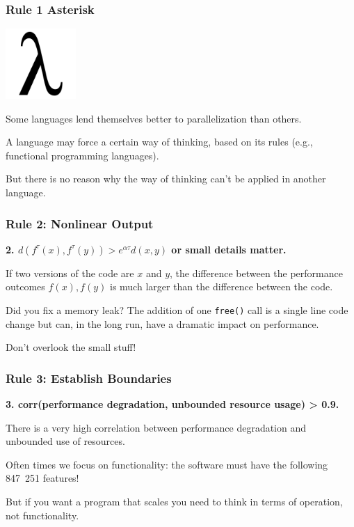 \begin{frame}
\frametitle{Rule 1 Asterisk}

\begin{center}
	\includegraphics[width=0.2\textwidth]{images/lambda.png}
\end{center}

Some languages lend themselves better to parallelization than others. 

A language may force a certain way of thinking, based on its rules (e.g., functional programming languages). 

But there is no reason why the way of thinking can't be applied in another language.


\end{frame}



\begin{frame}
\frametitle{Rule 2: Nonlinear Output}

\textbf{2. $d(f^{\tau}(x), f^{\tau}(y)) > e^{\alpha\tau} d(x, y)$ or small details matter.}

If two versions of the code are $x$ and $y$, the difference between the performance outcomes $f(x), f(y)$ is much larger than the difference between the code.

Did you fix a memory leak? The addition of one \texttt{free()} call is a single line code change but can, in the long run, have a dramatic impact on performance. 

Don't overlook the small stuff!

\end{frame}




\begin{frame}
\frametitle{Rule 3: Establish Boundaries}

\textbf{3. corr(performance degradation, unbounded resource usage) > 0.9.}

There is a very high correlation between performance degradation and unbounded use of resources. 

Often times we focus on functionality: the software must have the following 847~251 features! 

But if you want a program that scales you need to think in terms of operation, not functionality.

\end{frame}



